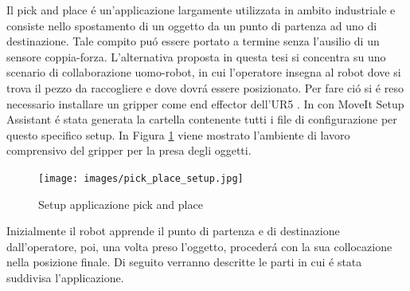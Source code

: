 Il pick and place \'{e} un'applicazione largamente utilizzata in ambito industriale e consiste nello spostamento di un oggetto 
da un punto di partenza ad uno di destinazione. Tale compito pu\'{o} essere portato a termine senza l'ausilio di un sensore 
coppia-forza. L'alternativa proposta in questa tesi si concentra su uno scenario di collaborazione uomo-robot, in cui l'operatore 
insegna al robot dove si trova il pezzo da raccogliere e dove dovr\'{a} essere posizionato. 
Per fare ci\'{o} si \'{e} reso necessario installare un gripper come end effector 
dell'UR5 \cite{gripper_repo}. In \cite{environment_setup} con MoveIt Setup Assistant \'{e} stata generata la cartella contenente 
tutti i file di configurazione per questo specifico setup. 
In Figura \ref{fig:pick_place} viene mostrato l'ambiente di lavoro comprensivo del gripper per la presa degli oggetti. 
\begin{figure}[H]
    \centering
    \texttt{[image: images/pick\_place\_setup.jpg]}
    \caption{Setup applicazione pick and place}
    \label{fig:pick_place}
\end{figure}
Inizialmente il robot apprende il punto di partenza e di destinazione dall'operatore, poi, una volta preso l'oggetto, 
proceder\'{a} con la sua collocazione nella posizione finale.
Di seguito verranno descritte le parti in cui \'{e} stata suddivisa l'applicazione.
